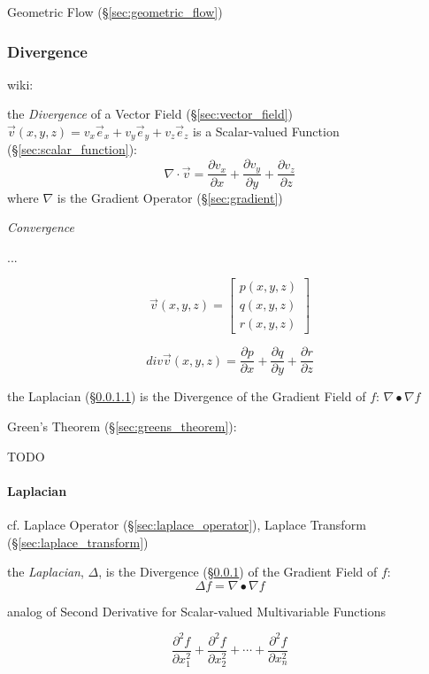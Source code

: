 Geometric Flow (\S\ref{sec:geometric_flow})



\subsubsection{Divergence}\label{sec:divergence}

wiki:

the \emph{Divergence} of a Vector Field (\S\ref{sec:vector_field})
$\vec{v}(x,y,z) = v_x\vec{e}_x + v_y\vec{e}_y + v_z\vec{e}_z$ is a
Scalar-valued Function (\S\ref{sec:scalar_function}):
\[
  \nabla \cdot \vec{v} =
    \frac{\partial v_x}{\partial x} +
    \frac{\partial v_y}{\partial y} +
    \frac{\partial v_z}{\partial z}
\]
where $\nabla$ is the Gradient Operator (\S\ref{sec:gradient})

\emph{Convergence}

...

\[
  \vec{v}(x,y,z) = \begin{bmatrix}
    p(x,y,z) \\
    q(x,y,z) \\
    r(x,y,z)
  \end{bmatrix}
\]

\[
  div\vec{v}(x,y,z)
    = \frac{\partial{p}}{\partial{x}}
    + \frac{\partial{q}}{\partial{y}}
    + \frac{\partial{r}}{\partial{z}}
\]

the Laplacian (\S\ref{sec:laplacian}) is the Divergence of the Gradient Field
of $f$: $\nabla \bullet \nabla f$

Green's Theorem (\S\ref{sec:greens_theorem}):

TODO



\paragraph{Laplacian}\label{sec:laplacian}\hfill

\fist cf. Laplace Operator (\S\ref{sec:laplace_operator}), Laplace Transform
(\S\ref{sec:laplace_transform}) %

the \emph{Laplacian}, $\Delta$, is the Divergence (\S\ref{sec:divergence}) of
the Gradient Field of $f$:
\[
  \Delta f = \nabla \bullet \nabla f
\]

analog of Second Derivative for Scalar-valued Multivariable Functions

\[
  \frac{\partial^2 f}{\partial{x_1^2}} +
  \frac{\partial^2 f}{\partial{x_2^2}} +
  \cdots +
  \frac{\partial^2 f}{\partial{x_n^2}}
\]

